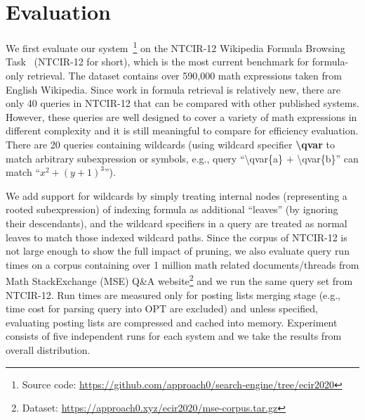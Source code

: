 \documentclass[runningheads]{llncs}
\begin{document}
\section{Evaluation}
We first evaluate our system~\footnote{Source code: \url{https://github.com/approach0/search-engine/tree/ecir2020}} on the NTCIR-12 Wikipedia Formula Browsing Task~\cite{ntcir12} (NTCIR-12 for short), which is the most current benchmark for formula-only retrieval.
The dataset contains over 590,000 math expressions taken from English Wikipedia.
%
Since work in formula retrieval is relatively new, there are only 40 queries in NTCIR-12 that can be compared with other published systems. However, these queries are well designed to cover a variety of math expressions in different complexity and it is still meaningful to compare for efficiency evaluation. There are 20 queries containing wildcards (using wildcard specifier \textbf{\textbackslash{}qvar} to match arbitrary subexpression or symbols, e.g., query ``\textbackslash qvar\{a\} + \textbackslash qvar\{b\}'' can match ``$x^2 + (y + 1)^3$'').

We add support for wildcards by simply treating internal nodes (representing a rooted subexpression) of indexing formula as additional ``leaves'' (by ignoring their descendants), and the wildcard specifiers in a query are treated as normal leaves to match those indexed wildcard paths.
Since the corpus of NTCIR-12 is not large enough to show the full impact of pruning, we also evaluate query run times on a corpus containing over 1 million math related documents/threads from Math StackExchange (MSE) Q\&A website\footnote{Dataset: \url{https://approach0.xyz/ecir2020/mse-corpus.tar.gz}} and we run the same query set from NTCIR-12.
%
Run times are measured only for posting lists merging stage (e.g., time cost for parsing query into OPT are excluded) and unless specified, evaluating posting lists are compressed and cached into memory.
%
Experiment consists of five independent runs for each system and we take the results from overall distribution.
\end{document}
